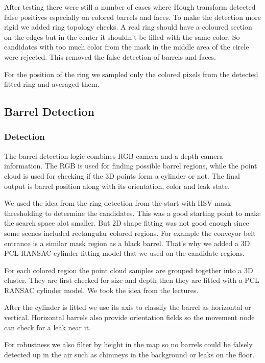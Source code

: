 \documentclass[a4paper, 11pt]{article}
\begin{document}
After testing there were still a number of cases where Hough transform detected false positives especially on colored barrels and faces. To make the detection more rigid we added ring topology checks. A real ring should have a coloured section on the edges but in the center it shouldn't be filled with the same color. So candidates with too much color from the mask in the middle area of the circle were rejected. This removed the false detection of barrels and faces.

For the position of the ring we sampled only the colored pixels from the detected fitted ring and averaged them.

\subsection{Barrel Detection}

\subsubsection{Detection}

The barrel detection logic combines RGB camera and a depth camera information. The RGB is used for finding possible barrel regions, while the point cloud is used for checking if the 3D points form a cylinder or not. The final output is barrel position along with its orientation, color and leak state.

We used the idea from the ring detection from the start with HSV mask thresholding to determine the candidates. This was a good starting point to make the search space alot smaller. But 2D shape fitting was not good enough since some scenes included rectangular colored regions. For example the conveyor belt entrance is a similar mask region as a black barrel. That's why we added a 3D PCL RANSAC cylinder fitting model that we used on the candidate regions.

For each colored region the point cloud samples are grouped together into a 3D cluster. They are first checked for size and depth then they are fitted with a PCL RANSAC cylinder model. We took the idea from the lectures.

After the cylinder is fitted we use its axis to classify the barrel as horizontal or vertical. Horizontal barrels also provide orientation fields so the movement node can check for a leak near it.

For robustness we also filter by height in the map so no barrels could be falsely detected up in the air such as chimneys in the background or leaks on the floor.
\end{document}
